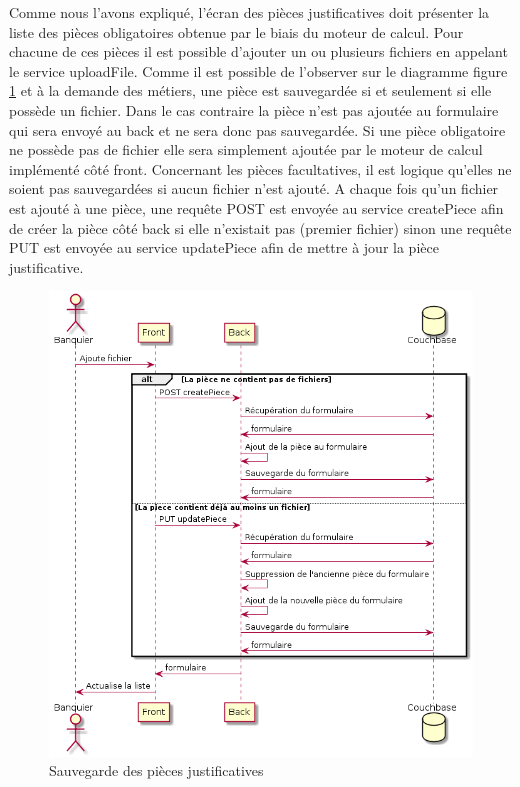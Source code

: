 	Comme nous l'avons expliqué, l'écran des pièces justificatives doit présenter la liste des pièces obligatoires obtenue par le biais du moteur de calcul. Pour chacune de ces pièces il est possible d'ajouter un ou plusieurs fichiers en appelant le service uploadFile. Comme il est possible de l'observer sur le diagramme figure \ref{seqSave} et à la demande des métiers, une pièce est sauvegardée si et seulement si elle possède un fichier. Dans le cas contraire la pièce n'est pas ajoutée au formulaire qui sera envoyé au back et ne sera donc pas sauvegardée. Si une pièce obligatoire ne possède pas de fichier elle sera simplement ajoutée par le moteur de calcul implémenté côté front. Concernant les pièces facultatives, il est logique qu'elles ne soient pas sauvegardées si aucun fichier n'est ajouté. A chaque fois qu'un fichier est ajouté à une pièce, une requête POST est envoyée au service createPiece afin de créer la pièce côté back si elle n'existait pas (premier fichier) sinon une requête PUT est envoyée au service updatePiece afin de mettre à jour la pièce justificative. \\

\begin{figure}[h!]
	\includegraphics[scale=0.55]{images/travailBP1818/piecesJustif/seqSave.png}
	\centering
	\caption{Sauvegarde des pièces justificatives}
	\label{seqSave}
\end{figure}

